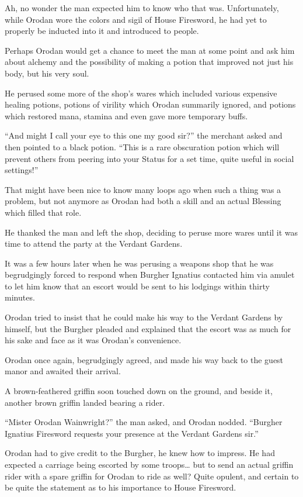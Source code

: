 \documentclass[a4paper,10pt]{book}
\begin{document}
Ah, no wonder the man expected him to know who that was. Unfortunately, while Orodan wore the colors and sigil of House Firesword, he had yet to properly be inducted into it and introduced to people.\par
Perhaps Orodan would get a chance to meet the man at some point and ask him about alchemy and the possibility of making a potion that improved not just his body, but his very soul.\par
He perused some more of the shop’s wares which included various expensive healing potions, potions of virility which Orodan summarily ignored, and potions which restored mana, stamina and even gave more temporary buffs.\par
“And might I call your eye to this one my good sir?” the merchant asked and then pointed to a black potion. “This is a rare obscuration potion which will prevent others from peering into your Status for a set time, quite useful in social settings!”\par
That might have been nice to know many loops ago when such a thing was a problem, but not anymore as Orodan had both a skill and an actual Blessing which filled that role.\par
He thanked the man and left the shop, deciding to peruse more wares until it was time to attend the party at the Verdant Gardens.\par
\par
It was a few hours later when he was perusing a weapons shop that he was begrudgingly forced to respond when Burgher Ignatius contacted him via amulet to let him know that an escort would be sent to his lodgings within thirty minutes.\par
Orodan tried to insist that he could make his way to the Verdant Gardens by himself, but the Burgher pleaded and explained that the escort was as much for his sake and face as it was Orodan’s convenience.\par
Orodan once again, begrudgingly agreed, and made his way back to the guest manor and awaited their arrival.\par
A brown-feathered griffin soon touched down on the ground, and beside it, another brown griffin landed bearing a rider.\par
“Mister Orodan Wainwright?” the man asked, and Orodan nodded. “Burgher Ignatius Firesword requests your presence at the Verdant Gardens sir.”\par
Orodan had to give credit to the Burgher, he knew how to impress. He had expected a carriage being escorted by some troops… but to send an actual griffin rider with a spare griffin for Orodan to ride as well? Quite opulent, and certain to be quite the statement as to his importance to House Firesword.\par
\end{document}
